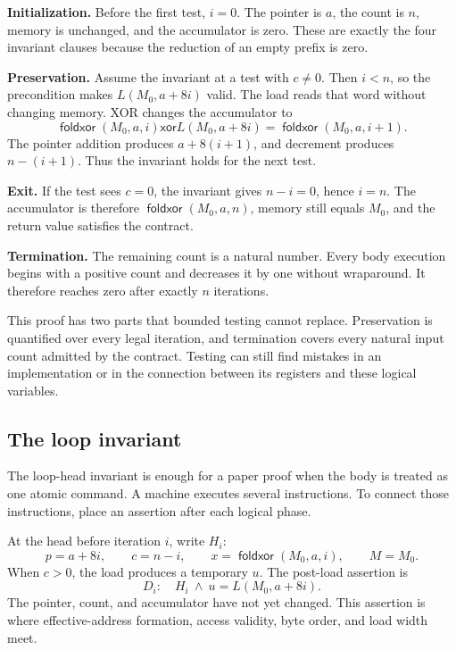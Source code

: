 \begin{proofkit}[title={Reader proof of the logical loop}]
\textbf{Initialization.} Before the first test, \(i=0\). The pointer is \(a\),
the count is \(n\), memory is unchanged, and the accumulator is zero. These
are exactly the four invariant clauses because the reduction of an empty
prefix is zero.

\textbf{Preservation.} Assume the invariant at a test with \(c\ne0\). Then
\(i<n\), so the precondition makes \(L(M_0,a+8i)\) valid. The load reads that
word without changing memory. XOR changes the accumulator to
\[
 \mathop{\mathsf{foldxor}}(M_0,a,i)
 \mathbin{\mathsf{xor}}L(M_0,a+8i)
 =\mathop{\mathsf{foldxor}}(M_0,a,i+1).
\]
The pointer addition produces \(a+8(i+1)\), and decrement produces
\(n-(i+1)\). Thus the invariant holds for the next test.

\textbf{Exit.} If the test sees \(c=0\), the invariant gives \(n-i=0\), hence
\(i=n\). The accumulator is therefore
\(\mathop{\mathsf{foldxor}}(M_0,a,n)\), memory still equals \(M_0\), and the
return value satisfies the contract.

\textbf{Termination.} The remaining count is a natural number. Every body
execution begins with a positive count and decreases it by one without
wraparound. It therefore reaches zero after exactly \(n\) iterations.
\end{proofkit}

This proof has two parts that bounded testing cannot replace. Preservation is
quantified over every legal iteration, and termination covers every natural
input count admitted by the contract. Testing can still find mistakes in an
implementation or in the connection between its registers and these logical
variables.

\subsection{The loop invariant}

The loop-head invariant is enough for a paper proof when the body is treated
as one atomic command. A machine executes several instructions. To connect
those instructions, place an assertion after each logical phase.

At the head before iteration \(i\), write \(H_i\):
\[
 p=a+8i,\qquad c=n-i,\qquad
 x=\mathop{\mathsf{foldxor}}(M_0,a,i),\qquad M=M_0.
\]
When \(c>0\), the load produces a temporary \(u\). The post-load assertion is
\[
 D_i:\quad H_i\ \land\ u=L(M_0,a+8i).
\]
The pointer, count, and accumulator have not yet changed. This assertion is
where effective-address formation, access validity, byte order, and load width
meet.

